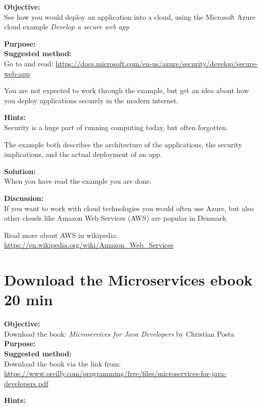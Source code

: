 \documentclass[a4paper,11pt,notitlepage]{report}
\begin{document}
{\bf Objective:}\\
See how you would deploy an application into a cloud, using the Microsoft Azure cloud example
\emph{Develop a secure web app}



{\bf Purpose:}\\

{\bf Suggested method:}\\
Go to and read: \url{https://docs.microsoft.com/en-us/azure/security/develop/secure-web-app}

You are not expected to work through the example, but get an idea about how you deploy applications securely in the modern internet.

{\bf Hints:}\\
Security is a huge part of running computing today, but often forgotten.

The example both describes the architecture of the applications, the security implications, and the actual deployment of an app.

{\bf Solution:}\\
When you have read the example you are done.

{\bf Discussion:}\\
If you want to work with cloud technologies you would often use Azure, but also other clouds like Amazon Web Services (AWS) are popular in Denmark.

Read more about AWS in wikipedia:\\
\url{https://en.wikipedia.org/wiki/Amazon_Web_Services}




\chapter{Download the Microservices ebook 20 min}
\label{ex:download-microservices-book}


{\bf Objective:}\\
Download the book: \emph{Microservices for Java Developers}
by Christian Posta
{\bf Purpose:}\\

{\bf Suggested method:}\\
Download the book via the link from:\\
\url{https://www.oreilly.com/programming/free/files/microservices-for-java-developers.pdf}

{\bf Hints:}\\
\end{document}
